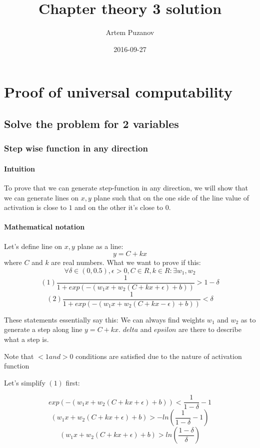 \documentclass{article}
\title{Chapter theory 3 solution}
\date{2016-09-27}
\author{Artem Puzanov}
\begin{document}
\maketitle
{}
\newpage
{}


\section{Proof of universal computability}
\subsection{Solve the problem for 2 variables}

\subsubsection{Step wise function in any direction}
\paragraph{Intuition}
To prove that we can generate step-function in any direction, we will show that we can
generate lines on ${x, y}$ plane such that on the one side of the line value of activation is close to $1$
and on the other it's close to $0$. 
\paragraph{Mathematical notation}
Let's define line on ${x, y}$ plane as a line:
$$y = C + kx$$
where $C$ and $k$ are real numbers.
What we want to prove if this:
$$\forall \delta \in (0, 0.5), \epsilon > 0 , C \in R,  k \in R: \exists w_1, w_2$$
$$(1) \frac{1}{1 + exp(-(w_1x + w_2(C + kx + \epsilon) + b))} > 1 - \delta$$
$$(2) \frac{1}{1 + exp(-(w_1x + w_2(C + kx - \epsilon) + b))} < \delta$$

These statements essentially say this:
We can always find weights $w_1$ and $w_2$ as to generate a step along line $y = C + kx$.
$delta$ and $epsilon$ are there to describe what a step is.

Note that $<1 and >0$ conditions are satisfied due to the nature of activation function

Let's simplify $(1)$ first:

$$exp(-(w_1x + w_2(C + kx + \epsilon) + b)) < \frac{1}{1 - \delta} - 1$$
$$(w_1x + w_2(C + kx + \epsilon) + b) > -ln(\frac{1}{1 - \delta} - 1)$$
$$(w_1x + w_2(C + kx + \epsilon) + b) > ln(\frac{1 - \delta}{\delta})$$
\end{document}
